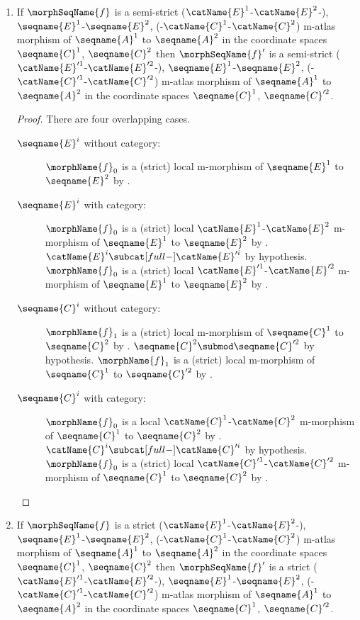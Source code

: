 \documentclass{article}
\begin{document}
\begin{lemma}
\begin{enumerate}
\item
\label{M-ATLmorph:SstrictisSstricttosup}
If $\morphSeqName{f}$ is a semi-strict
\nobreaks
  {
    {($\catName{E}^1$-$\catName{E}^2$-)},
    {$\seqname{E}^1$-$\seqname{E}^2$},
    {(-$\catName{C}^1$-$\catName{C}^2$)}
  }
m-atlas morphism of $\seqname{A}^1$ to $\seqname{A}^2$ in the
coordinate spaces $\seqname{C}^1$, $\seqname{C}^2$ then
$\morphSeqName{f}'$ is a semi-strict
\nobreaks
  {
    {($\catName{E}'^1$-$\catName{E}'^2$-)},
    {$\seqname{E}^1$-$\seqname{E}^2$},
    {(-$\catName{C}'^1$-$\catName{C}'^2$)}
  }
m-atlas morphism of $\seqname{A}^1$ to $\seqname{A}^2$ in the
coordinate spaces $\seqname{C}^1$, $\seqname{C}'^2$.

\begin{proof}
There are four overlapping cases.
\begin{description}
\item[$\seqname{E}^i$ without category:]
$\morphName{f}_0$ is a (strict) local m-morphism of $\seqname{E}^1$ to
$\seqname{E}^2$ by .

\item[$\seqname{E}^i$ with category:]
$\morphName{f}_0$ is a (strict) local $\catName{E}^1$-$\catName{E}^2$
m-morphism of $\seqname{E}^1$ to $\seqname{E}^2$ by
.
$\catName{E}^i \subcat[full-] \catName{E}'^i$ by hypothesis.
$\morphName{f}_0$ is a (strict) local $\catName{E}'^1$-$\catName{E}'^2$
m-morphism of $\seqname{E}^1$ to $\seqname{E}^2$ by
.

\item[$\seqname{C}^i$ without category:]
$\morphName{f}_1$ is a (strict) local m-morphism of $\seqname{C}^1$ to
$\seqname{C}^2$ by .
$\seqname{C}^2 \submod \seqname{C}'^2$ by hypothesis.
$\morphName{f}_1$ is a (strict) local m-morphism of $\seqname{C}^1$ to
$\seqname{C}'^2$ by .

\item[$\seqname{C}^i$ with category:]
$\morphName{f}_0$ is a local $\catName{C}^1$-$\catName{C}^2$
m-morphism of $\seqname{C}^1$ to $\seqname{C}^2$ by
.
$\catName{C}^i \subcat[full-] \catName{C}'^i$ by hypothesis.
$\morphName{f}_0$ is a (strict) local $\catName{C}'^1$-$\catName{C}'^2$
m-morphism of $\seqname{C}^1$ to $\seqname{C}^2$ by
.
\end{description}
\end{proof}

\item
\label{M-ATLmorph:strictisstricttosup}
If $\morphSeqName{f}$ is a strict
\nobreaks
  {
    {($\catName{E}^1$-$\catName{E}^2$-)},
    {$\seqname{E}^1$-$\seqname{E}^2$},
    {(-$\catName{C}^1$-$\catName{C}^2$)}
  }
m-atlas morphism of $\seqname{A}^1$ to $\seqname{A}^2$ in the
coordinate spaces $\seqname{C}^1$, $\seqname{C}^2$ then
$\morphSeqName{f}'$ is a strict
\nobreaks
  {
    {($\catName{E}'^1$-$\catName{E}'^2$-)},
    {$\seqname{E}^1$-$\seqname{E}^2$},
    {(-$\catName{C}'^1$-$\catName{C}'^2$)}
  }
m-atlas morphism of $\seqname{A}^1$ to $\seqname{A}^2$ in the
coordinate spaces $\seqname{C}^1$, $\seqname{C}'^2$.


\end{enumerate}
\end{lemma}
\end{document}
